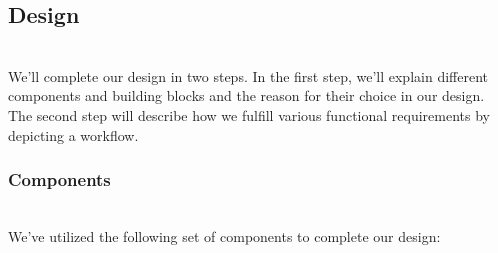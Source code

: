 

\subsection{Design}\label{tT6G4UA7j1bZCnD9AS1qi}
\\
We'll complete our design in two steps. In the first step, we'll explain different components and building blocks and the reason for their choice in our design. The second step will describe how we fulfill various functional requirements by depicting a workflow.

\subsubsection{Components}\label{_xH9I9a-3cEh7vsc1pjn4}
\\
We've utilized the following set of components to complete our design:

